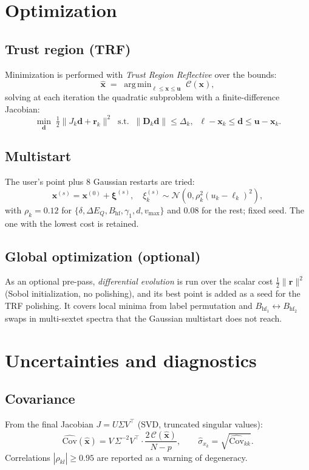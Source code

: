 \documentclass[11pt,a4paper]{article}
\newcommand{\BHF}{B_{\mathrm{hf}}}
\newcommand{\dEQ}{\Delta E_{Q}}
\DeclareMathOperator*{\argmin}{arg\,min}
\begin{document}
\section{Optimization}\label{sec:opt}

\subsection{Trust region (TRF)}
Minimization is performed with \emph{Trust Region Reflective} over the bounds:
\begin{equation}
  \hat{\bm x} \;=\; \argmin_{\bm\ell\le\bm x\le\bm u}\; \mathcal C(\bm x),
\end{equation}
solving at each iteration the quadratic subproblem with a finite-difference
Jacobian:
\begin{equation}
  \min_{\bm d}\;\tfrac12\|J_k\bm d + \bm r_k\|^{2}
  \;\;\text{s.t.}\;\; \|\bm D_k\bm d\|\le\Delta_k,\;\; \bm\ell-\bm x_k\le\bm d\le\bm u-\bm x_k.
\end{equation}

\subsection{Multistart}
The user's point plus 8 Gaussian restarts are tried:
\begin{equation}
  \bm x^{(s)}=\bm x^{(0)}+\bm\xi^{(s)},\quad \xi^{(s)}_k\sim\mathcal N(0,\rho_k^2(u_k-\ell_k)^2),
\end{equation}
with $\rho_k=0.12$ for $\{\delta,\dEQ,\BHF,\gamma_1,d,v_{\max}\}$ and $0.08$ for the
rest; fixed seed. The one with the lowest cost is retained.

\subsection{Global optimization (optional)}
As an optional pre-pass, \emph{differential evolution} is run over the scalar
cost $\tfrac12\|\bm r\|^2$ (Sobol initialization, no polishing), and its best point
is added as a seed for the TRF polishing. It covers local minima from label
permutation and $\BHF_1\!\leftrightarrow\!\BHF_2$ swaps in
multi-sextet spectra that the Gaussian multistart does not reach.

\section{Uncertainties and diagnostics}\label{sec:disc-stats}

\subsection{Covariance}
From the final Jacobian $J=U\Sigma V^\top$ (SVD, truncated singular values):
\begin{equation}
  \boxed{\;\widehat{\mathrm{Cov}}(\hat{\bm x}) = V\,\Sigma^{-2}V^\top\cdot\frac{2\,\mathcal C(\hat{\bm x})}{N-p},
  \qquad \hat\sigma_{x_k}=\sqrt{\widehat{\mathrm{Cov}}_{kk}}.\;}
  \label{eq:cov}
\end{equation}
Correlations $|\rho_{kl}|\ge0.95$ are reported as a warning of degeneracy.
\end{document}
